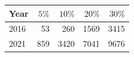 \begin{tabular}{@{}lrrrr@{}}
\toprule
Year & $5\%$ & $10\%$ & $20\%$ & $30\%$ \\
\midrule
2016 & 53 & 260 & 1569 & 3415 \\
2021 & 859 & 3420 & 7041 & 9676 \\
\bottomrule
\end{tabular}
